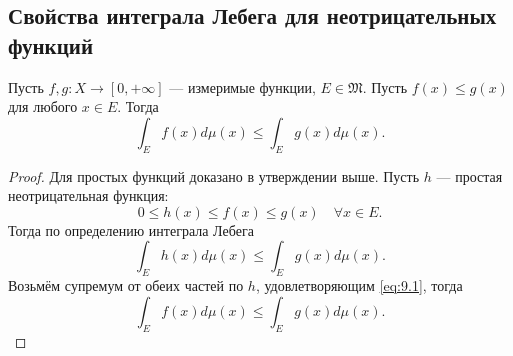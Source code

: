 \subsection{Свойства интеграла Лебега для неотрицательных функций}
\begin{statement}
    Пусть $f,g: X \to [0, +\infty]$ — измеримые функции, $E \in \mathfrak{M}$.
    Пусть $f(x) \leqslant g(x)$ для любого $x \in E$.
    Тогда
    \[\int_E f(x) d\mu(x) \leqslant \int_E g(x) d\mu(x).\]
\end{statement} 
\begin{proof}
    Для простых функций доказано в утверждении выше.
    Пусть $h$ — простая неотрицательная функция:
    \begin{equation}
        0 \leqslant h(x) \leqslant f(x) \leqslant g(x) \quad \forall x \in E. \label{eq:9.1}
    \end{equation}
    Тогда по определению интеграла Лебега
    \[\int_E h(x) d\mu(x) \leqslant \int_E g(x) d\mu(x).\]
    Возьмём супремум от обеих частей по $h$, удовлетворяющим \eqref{eq:9.1}, тогда
    \[\int_E f(x) d\mu(x) \leqslant \int_E g(x) d\mu(x).\]
\end{proof} 

